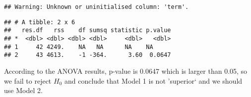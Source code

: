 \documentclass[]{article}
\begin{document}
\begin{verbatim}
## Warning: Unknown or uninitialised column: 'term'.
\end{verbatim}

\begin{verbatim}
## # A tibble: 2 x 6
##   res.df   rss    df sumsq statistic p.value
## *  <dbl> <dbl> <dbl> <dbl>     <dbl>   <dbl>
## 1     42 4249.    NA   NA      NA    NA     
## 2     43 4613.    -1 -364.      3.60  0.0647
\end{verbatim}

According to the ANOVA results, p-value is 0.0647 which is larger than
0.05, so we fail to reject \(H_0\) and conclude that Model 1 is not
'superior` and we should use Model 2.
\end{document}
